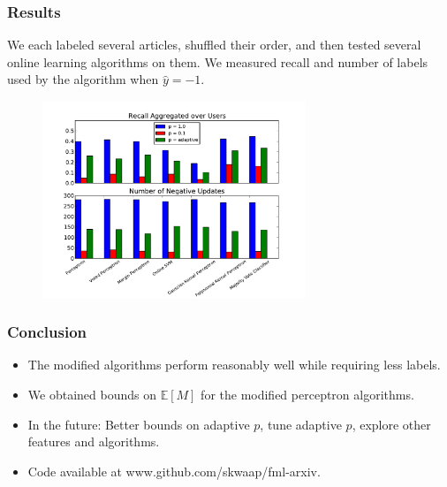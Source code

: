 \documentclass{beamer}
\begin{document}
\begin{frame}
\frametitle{Results}
We each labeled several articles, shuffled their order, and then
tested several online learning algorithms on them.  We measured recall
and number of labels used by the algorithm when $\hat{y} = -1$.
\begin{figure}
\centering
\includegraphics[width=0.7\textwidth]{EveryoneRecallPaper.pdf}
\end{figure}
\end{frame}


\begin{frame}
\frametitle{Conclusion}
\begin{itemize}
\item The modified algorithms perform reasonably well while requiring less labels.
\item We obtained bounds on  $\mathbb{E}[M]$ for the modified perceptron algorithms.
\item In the future: Better bounds on adaptive $p$, tune adaptive $p$, explore other features and algorithms.
\item Code available at www.github.com/skwaap/fml-arxiv.
\end{itemize}
\end{frame}
\end{document}
